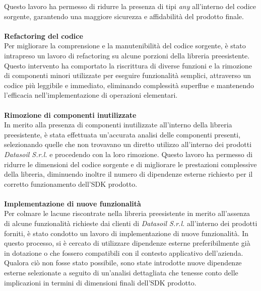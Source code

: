 Questo lavoro ha permesso di ridurre la presenza di tipi \textit{any} all'interno del codice sorgente, garantendo una maggiore sicurezza e affidabilità del prodotto finale. \\
\\
\textbf{Refactoring del codice}\\
Per migliorare la comprensione e la manutenibilità del codice sorgente, è stato intrapreso un lavoro di refactoring su alcune porzioni della libreria preesistente.
Questo intervento ha comportato la riscrittura di diverse funzioni e la rimozione di componenti minori utilizzate per eseguire funzionalità semplici, attraverso un codice
più leggibile e immediato, eliminando complessità superflue e mantenendo l'efficacia nell'implementazione di operazioni elementari.\\
\\
\textbf{Rimozione di componenti inutilizzate}\\
In merito alla presenza di componenti inutilizzate all'interno della libreria preesistente, è stata effettuata un'accurata analisi delle componenti presenti, selezionando
quelle che non trovavano un diretto utilizzo all'interno dei prodotti \textit{Datasoil S.r.l.} e procedendo con la loro rimozione. \newline
Questo lavoro ha permesso di ridurre le dimensioni del codice sorgente e di migliorare le prestazioni complessive della libreria, diminuendo inoltre il numero di dipendenze
esterne richiesto per il corretto funzionamento dell'SDK prodotto.\\
\\
\textbf{Implementazione di nuove funzionalità}\\
Per colmare le lacune riscontrate nella libreria preesistente in merito all'assenza di alcune funzionalità richieste dai clienti di \textit{Datasoil S.r.l.} all'interno dei prodotti forniti,
è stato condotto un lavoro di implementazione di nuove funzionalità. \newline
In questo processo, si è cercato di utilizzare dipendenze esterne preferibilmente già in dotazione o che fossero compatibili con il contesto applicativo dell'azienda. Qualora ciò non
fosse stato possibile, sono state introdotte nuove dipendenze esterne selezionate a seguito di un'analisi dettagliata che tenesse conto delle implicazioni in termini di dimensioni
finali dell'SDK prodotto.

